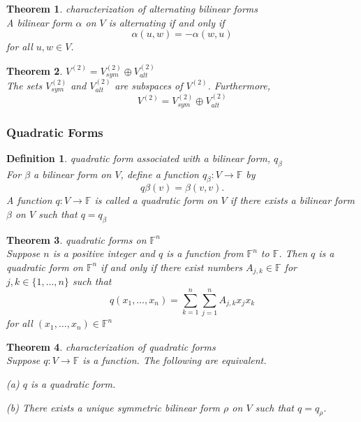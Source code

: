 \documentclass{article}
\newtheorem{theorem}{Theorem}[subsection]
\newtheorem{definition}{Definition}[subsection]
\newcommand{\FF}{\mathbb{F}}
\begin{document}
\begin{CJK}{UTF8}{gkai}
\begin{theorem}
    characterization of alternating bilinear forms\\

    A bilinear form $\alpha$ on $V$ is alternating if and only if
    \[\alpha(u,w) = -\alpha(w,u)\]
    for all $u,w \in V$.
\end{theorem}

\begin{theorem}
    $V^{(2)} = V^{(2)}_{sym} \oplus V^{(2)}_{alt}$\\

    The sets $V^{(2)}_{sym}$ and $V^{(2)}_{alt}$ are subspaces of $V^{(2)}$. Furthermore,
    \[V^{(2)} = V^{(2)}_{sym} \oplus V^{(2)}_{alt}\]
\end{theorem}

\subsubsection{Quadratic Forms}

\begin{definition}
    quadratic form associated with a bilinear form, $q_\beta$\\

    For $\beta$ a bilinear form on $V$, define a function $q_\beta: V \to \FF$ by 
    \[q\beta(v) = \beta(v,v).\]
    A function $q: V \to \FF$ is called a quadratic form on $V$ if there exists a bilinear form $\beta$ on $V$ such that $q = q_\beta$
\end{definition}

\begin{theorem}
    quadratic forms on $\FF^n$\\

    Suppose $n$ is a positive integer and $q$ is a function from $\FF^n$ to $\FF$. Then $q$ is a quadratic form on $\FF^n$ if and only if there exist numbers $A_{j,k} \in \FF$ for $j, k \in \{1,\ldots,n\}$ such that
    \[q(x_1, \ldots,x_n) =\sum_{k = 1}^{n}\sum_{j = 1}^{n}A_{j,k}x_j x_k\]
    for all $(x_1,\ldots,x_n) \in \FF^n$
\end{theorem}

\begin{theorem}
    characterization of quadratic forms\\

    Suppose $q: V \to \FF$ is a function. The following are equivalent.

    (a) $q$ is a quadratic form.

    (b) There exists a unique symmetric bilinear form $\rho$ on $V$ such that $q = q_{\rho}$.


\end{theorem}
\end{CJK}
\end{document}
